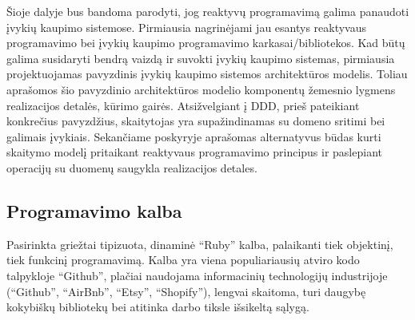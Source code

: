 Šioje dalyje bus bandoma parodyti, jog reaktyvų programavimą galima panaudoti įvykių kaupimo sistemose. Pirmiausia nagrinėjami jau esantys reaktyvaus programavimo bei įvykių kaupimo programavimo karkasai/bibliotekos. Kad būtų galima susidaryti bendrą vaizdą ir suvokti įvykių kaupimo sistemas, pirmiausia projektuojamas pavyzdinis įvykių kaupimo sistemos architektūros modelis. Toliau aprašomos šio pavyzdinio architektūros modelio komponentų žemesnio lygmens realizacijos detalės, kūrimo gairės. Atsižvelgiant į DDD, prieš pateikiant konkrečius pavyzdžius, skaitytojas yra supažindinamas su domeno sritimi bei galimais įvykiais. Sekančiame poskyryje aprašomas alternatyvus būdas kurti skaitymo modelį pritaikant reaktyvaus programavimo principus ir paslepiant operacijų su duomenų saugykla realizacijos detales.

\subsection{Programavimo kalba}

Pasirinkta griežtai tipizuota, dinaminė ``Ruby'' kalba, palaikanti tiek objektinį, tiek funkcinį programavimą. Kalba yra viena populiariausių atviro kodo talpykloje ``Github'', plačiai naudojama informacinių technologijų industrijoje (``Github'', ``AirBnb'', ``Etsy'', ``Shopify''), lengvai skaitoma, turi daugybę kokybiškų bibliotekų bei atitinka darbo tiksle išsikeltą sąlygą.



